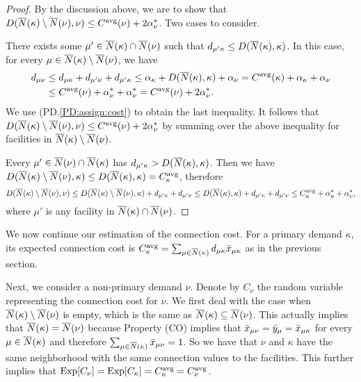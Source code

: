 \begin{proof}
  By the discussion above, we are to show that $D({\overline{N}}(\kappa)
  \setminus {\overline{N}}(\nu), \nu) \leq C^{{\mbox{\scriptsize\rm avg}}}(\nu) +
  2\alpha_{\nu}^\ast$. Two cases to consider.

   There exists some $\mu'\in {\overline{N}}(\kappa) \cap
  {\overline{N}}(\nu)$ such that $d_{\mu' \kappa} \leq D({\overline{N}}(\kappa),
  \kappa)$. In this case, for every $\mu\in {\overline{N}}(\kappa)\setminus
  {\overline{N}}(\nu)$, we have
\begin{align*}
  d_{\mu \nu} &\leq d_{\mu \kappa} + d_{\mu' \nu} +
  d_{\mu' \kappa} \leq \alpha_{\kappa} + D({\overline{N}}(\kappa), \kappa) +
  \alpha_{\nu} = C^{{\mbox{\scriptsize\rm avg}}}(\kappa) + \alpha_{\kappa} + \alpha_{\nu}\\
  &\leq C^{{\mbox{\scriptsize\rm avg}}}(\nu) + \alpha_{\nu}^\ast + \alpha_{\nu}^\ast =
  C^{{\mbox{\scriptsize\rm avg}}}(\nu) + 2\alpha_{\nu}^\ast.
\end{align*}
We use (PD.\ref{PD:assign:cost}) to obtain the last inequality.  It
follows that $D({\overline{N}}(\kappa) \setminus {\overline{N}}(\nu), \nu) \leq
C^{{\mbox{\scriptsize\rm avg}}}(\nu) + 2\alpha_{\nu}^\ast$ by summing over the above
inequality for facilities in ${\overline{N}}(\kappa) \setminus {\overline{N}}(\nu)$.

 Every $\mu'\in {\overline{N}}(\nu)\cap {\overline{N}}(\kappa)$
has $d_{\mu'\kappa} > D({\overline{N}}(\kappa),\kappa)$. Then we
have $D({\overline{N}}(\kappa) \setminus {\overline{N}}(\nu),\kappa)\leq
D({\overline{N}}(\kappa),\kappa)=C^{{\mbox{\scriptsize\rm avg}}}_{\kappa}$, therefore
\begin{equation*}
  D({\overline{N}}(\kappa) \setminus {\overline{N}}(\nu), \nu) \leq 
  D({\overline{N}}(\kappa) \setminus {\overline{N}}(\nu), \kappa) + d_{\mu' \kappa} +
  d_{\mu' \nu} \leq 
  D({\overline{N}}(\kappa), \kappa) +
  d_{\mu' \kappa} + d_{\mu' \nu} \leq C^{{\mbox{\scriptsize\rm avg}}}_{\kappa} +
  \alpha_{\kappa}^\ast + \alpha_{\nu}^\ast,  
\end{equation*}
where $\mu'$ is any facility in ${\overline{N}}(\kappa)\cap {\overline{N}}(\nu)$.
\end{proof}

We now continue our estimation of the connection cost.
For a primary demand $\kappa$, its expected connection cost
is $C^{\mbox{\scriptsize\rm avg}}_{\kappa} = \sum_{\mu\in{\overline{N}}(\kappa)}
d_{\mu\kappa}{\bar x}_{\mu\kappa}$ as in the previous section.

Next, we consider a non-primary demand $\nu$.
Denote by $C_\nu$ the random variable representing the connection
cost for $\nu$. We first deal with the case when
${\overline{N}}(\kappa)\setminus {\overline{N}}(\nu)$ is empty, which is the
same as ${\overline{N}}(\kappa) \subseteq {\overline{N}}(\nu)$. This
actually implies that ${\overline{N}}(\kappa) = {\overline{N}}(\nu)$ because
Property (CO) implies that ${\bar x}_{\mu\nu} = {\bar y}_{\mu} =
{\bar x}_{\mu\kappa}$ for every $\mu \in {\overline{N}}(\kappa)$ and
therefore $\sum_{\mu\in{\overline{N}}(\kappa)} {\bar x}_{\mu\nu} =
1$. So we have that $\nu$ and $\kappa$ have the same neighborhood
with the same connection values to the facilities. This further
implies that $\mbox{\rm Exp}[C_{\nu}] = \mbox{\rm Exp}[C_{\kappa}] =
C^{{\mbox{\scriptsize\rm avg}}}_{\kappa} = C^{{\mbox{\scriptsize\rm avg}}}_{\nu}$. 

